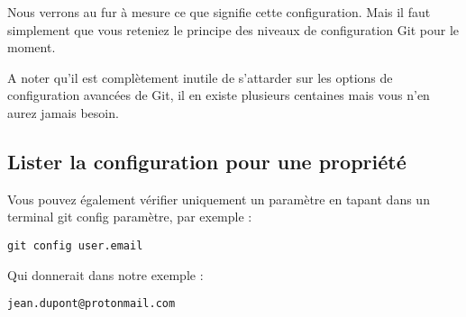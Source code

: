 \documentclass{article}
\begin{document}
Nous verrons au fur à mesure ce que signifie cette configuration. Mais il faut simplement que vous reteniez le principe des niveaux de configuration {\color{blue}Git} pour le moment.

A noter qu'il est complètement inutile de s'attarder sur les options de configuration avancées de {\color{blue}Git}, il en existe plusieurs centaines mais vous n'en aurez jamais besoin.

\subsection{Lister la configuration pour une propriété}
Vous pouvez également vérifier uniquement un paramètre en tapant dans un terminal {\color{blue}git config paramètre}, par exemple :

\begin{verbatim}
git config user.email
\end{verbatim}
Qui donnerait dans notre exemple :
\begin{verbatim}
jean.dupont@protonmail.com
\end{verbatim}
\end{document}
